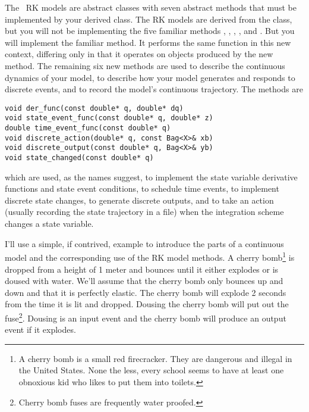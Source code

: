 The \adevs\ RK models are abstract classes with seven abstract methods that must be implemented by your derived class. The RK models are derived from the  class, but you will not be implementing the five familiar methods , , , , and . But you will implement the familiar  method. It performs the same function in this new context, differing only in that it operates on objects produced by the new  method. The remaining six new methods are used to describe the continuous dynamics of your model, to describe how your model generates and responds to discrete events, and to record the model's continuous trajectory. The methods are
\begin{verbatim}
void der_func(const double* q, double* dq)
void state_event_func(const double* q, double* z)
double time_event_func(const double* q)
void discrete_action(double* q, const Bag<X>& xb)
void discrete_output(const double* q, Bag<X>& yb)
void state_changed(const double* q)
\end{verbatim}
which are used, as the names suggest, to implement the state variable derivative functions and state event conditions, to schedule time events, to implement discrete state changes, to generate discrete outputs, and to take an action (usually recording the state trajectory in a file) when the integration scheme changes a state variable. 

I'll use a simple, if contrived, example to introduce the parts of a continuous model and the corresponding use of the RK model methods. 
A cherry bomb\footnote{A cherry bomb is a small red firecracker. They are dangerous and illegal in the United States. None the less, every school seems to have at least one obnoxious kid who likes to put them into toilets.} is dropped from a height of 1 meter and bounces until it either explodes or is doused with water. We'll assume that the cherry bomb only bounces up and down and that it is perfectly elastic. The cherry bomb will explode 2 seconds from the time it is lit and dropped. Dousing the cherry bomb will put out the fuse\footnote{Cherry bomb fuses are frequently water proofed.}. Dousing is an input event and the cherry bomb will produce an output event if it explodes.

